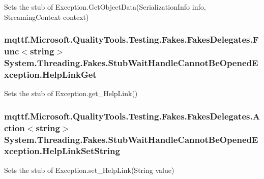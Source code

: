 Sets the stub of Exception.\-Get\-Object\-Data(\-Serialization\-Info info, Streaming\-Context context)

\hypertarget{class_system_1_1_threading_1_1_fakes_1_1_stub_wait_handle_cannot_be_opened_exception_a706330dac695cda655d9d984c74ce669}{
\subsubsection[{Help\-Link\-Get}]{\setlength{\rightskip}{0pt plus 5cm}mqttf.\-Microsoft.\-Quality\-Tools.\-Testing.\-Fakes.\-Fakes\-Delegates.\-Func$<$string$>$ System.\-Threading.\-Fakes.\-Stub\-Wait\-Handle\-Cannot\-Be\-Opened\-Exception.\-Help\-Link\-Get}}\label{class_system_1_1_threading_1_1_fakes_1_1_stub_wait_handle_cannot_be_opened_exception_a706330dac695cda655d9d984c74ce669}


Sets the stub of Exception.\-get\-\_\-\-Help\-Link()

\hypertarget{class_system_1_1_threading_1_1_fakes_1_1_stub_wait_handle_cannot_be_opened_exception_a84a2ed899e9a36e76436f8472190f22f}{
\subsubsection[{Help\-Link\-Set\-String}]{\setlength{\rightskip}{0pt plus 5cm}mqttf.\-Microsoft.\-Quality\-Tools.\-Testing.\-Fakes.\-Fakes\-Delegates.\-Action$<$string$>$ System.\-Threading.\-Fakes.\-Stub\-Wait\-Handle\-Cannot\-Be\-Opened\-Exception.\-Help\-Link\-Set\-String}}\label{class_system_1_1_threading_1_1_fakes_1_1_stub_wait_handle_cannot_be_opened_exception_a84a2ed899e9a36e76436f8472190f22f}


Sets the stub of Exception.\-set\-\_\-\-Help\-Link(\-String value)

